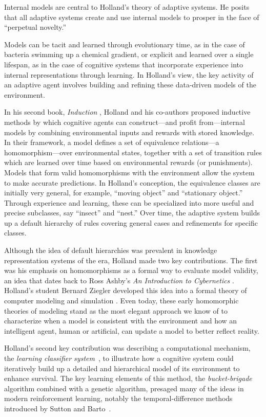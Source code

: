 \documentclass{sig-alternate}
\begin{document}
Internal models are central to Holland's theory of adaptive systems.
He posits that all adaptive systems create and use internal models to
prosper in the face of ``perpetual novelty.'' 

Models can be tacit and learned through evolutionary time, as in the
case of bacteria swimming up a chemical gradient, or explicit and
learned over a single lifespan, as in the case of cognitive systems
that incorporate experience into internal representations through
learning.  In Holland's view, the key activity of an adaptive agent
involves building and refining these data-driven models of the
environment.

In his second book, \emph{Induction} \cite{Holland1989}, Holland and
his co-authors proposed inductive methods by which cognitive agents
can construct---and profit from---internal models by combining
environmental inputs and rewards with stored knowledge.  In their
framework, a model defines a set of equivalence relations---a
homomorphism---over environmental states, together with a set of
transition rules which are learned over time based on environmental
rewards (or punishments).  Models that form valid homomorphisms with
the environment allow the system to make accurate predictions.  In
Holland's conception, the equivalence classes are initially very
general, for example, ``moving object'' and ``stationary object.''
Through experience and learning, these can be specialized into more
useful and precise subclasses, say ``insect'' and ``nest.''  Over
time, the adaptive system builds up a default hierarchy of rules
covering general cases and refinements for specific classes.

Although the idea of default hierarchies was prevalent in knowledge
representation systems of the era, Holland made two key contributions.
The first was his emphasis on homomorphisms as a formal way to
evaluate model validity, an idea that dates back to Ross Ashby's
\emph{An Introduction to Cybernetics} \cite{Ashby1956}. Holland's
student Bernard Ziegler developed this idea into a formal theory of
computer modeling and simulation \cite{Ziegler1976}.  Even today,
these early homomorphic theories of modeling stand as the most elegant
approach we know of to characterize when a model is consistent with
the environment and how an intelligent agent, human or artificial, can
update a model to better reflect reality.

Holland's second key contribution was describing a computational
mechanism, the \emph{learning classifier
  system}~\cite{Holland1986,Holland1977}, to illustrate how a cognitive system could
iteratively build up a detailed and hierarchical model of its
environment to enhance survival.  The key learning elements of this method, the
\emph{bucket-brigade} algorithm combined with a genetic algorithm, presaged many of the ideas in modern reinforcement
learning, notably the temporal-difference methods introduced by
Sutton and Barto~\cite{SuttonAndBarto1990}.
\end{document}
